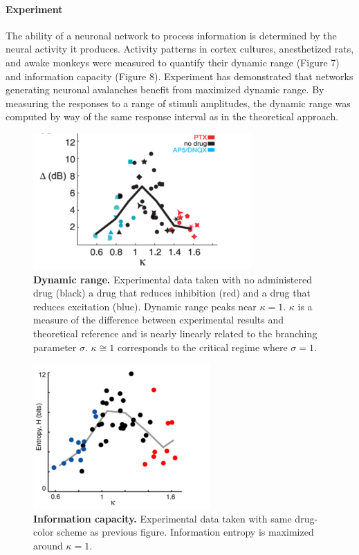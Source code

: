 \documentclass[12pt]{article}
\begin{document}
\paragraph{Experiment}
The ability of a neuronal network to process information is determined by the neural activity it produces. Activity patterns in cortex cultures, anesthetized rats, and awake monkeys were measured to quantify their dynamic range (Figure 7) and information capacity (Figure 8). Experiment has demonstrated that networks generating neuronal avalanches benefit from maximized dynamic range\cite{Shew2009b}. By measuring the responses to a range of stimuli amplitudes, the dynamic range was computed by way of the same response interval as in the theoretical approach.

\begin{figure}      
  \begin{center}    
 \includegraphics[width=.5\textwidth]{dynamicrangeexpplenz}    
    \caption{\textbf{Dynamic range.} Experimental data taken with no administered drug (black) a drug that reduces inhibition (red) and a drug that reduces excitation (blue). Dynamic range peaks near $\kappa = 1$. $\kappa$ is a measure of the difference between experimental results and theoretical reference and is nearly linearly related to the branching parameter $\sigma$. $\kappa \cong 1$ corresponds to the critical regime where $\sigma = 1$. \cite{Shew2009b}}   
   \label{Figure::Dynamic Range Experiment}   
  \end{center}     
   \end{figure}
  
\begin{figure}      
  \begin{center}    
 \includegraphics[width=.40\textwidth]{entropyplenz}    
    \caption{\textbf{Information capacity.} Experimental data taken with same drug-color scheme as previous figure. Information entropy is maximized around $\kappa = 1$. \cite{Shew2011a}}   
   \label{Figure::Entropy / information maximized experimental}   
  \end{center}     
   \end{figure}
   
\end{document}
